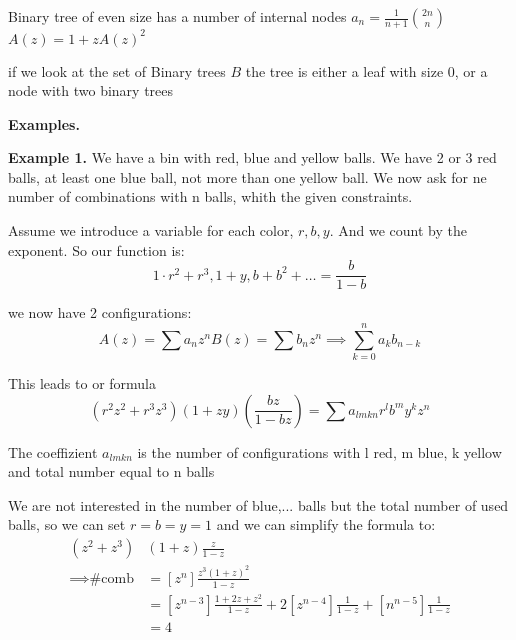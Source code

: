 


Binary tree of even size has a number of internal nodes $a_n = \frac{1}{n+1} {2n \choose n}$
$A(z) = 1 + zA(z)^2$

if we look at the set of Binary trees $B$ the tree is either a leaf with size 0, or a node with two binary trees

\textbf{Examples.}

\textbf{Example 1.}
We have a bin with red, blue and yellow balls. 
We have 2 or 3 red balls, at least one blue ball, not more than one yellow ball.
We now ask for ne number of combinations with n balls, whith the given constraints. 

Assume we introduce a variable for each color, $r,b,y$. And we count by the exponent. So our function is:
\[
    1\cdot r^2 + r^3,  1+y, b + b^2 + \ldots = \frac{b}{1-b}
\]

we now have 2 configurations:
\[
    A(z) = \sum a_n z^n
    B(z) = \sum b_n z^n
    \implies \sum_{k=0}^{n} a_k b_{n-k}
\]

This leads to or formula
\[
    (r^2  z^2+ r^3 z^3) (1+zy) \left(\frac{bz}{1-bz}\right) 
    = \sum a_{lmkn} r^l b^m y^k z^n
\]

The coeffizient $a_{lmkn}$ is the number of configurations with l red, m blue, k yellow and total number equal to n balls

We are not interested in the number of blue,... balls but the total number of used balls, so we can set $r=b=y=1$ and we can simplify the formula to:
\begin{align*}
    (z^2 + z^3)&(1+z) \frac{z}{1-z} \\
    \implies \text{\# comb} 
    &= \left[z^n\right] \frac{z^3(1+z)^2}{1-z} \\
    &= \left[z^{n-3}\right] \frac{1+2z +z^2}{1-z}+ 2\left[z^{n-4}\right] \frac{1}{1-z} + \left[n^{n-5}\right] \frac{1}{1-z} \\
    &= 4
\end{align*}

